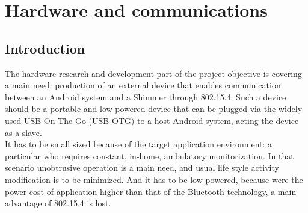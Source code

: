 \chapter{Hardware and communications}
\label{ch:hardware}
	\section{Introduction}	
	\label{sec:hw-intro}




	The hardware research and development part of the project objective is covering a main need: production of an external device that enables communication between an Android system and a Shimmer through 802.15.4. Such a device should be a portable and low-powered device that can be plugged via the widely used USB On-The-Go (USB OTG) to a host Android system, acting the device as a slave.\\

	It has to be small sized because of the target application environment: a particular who requires constant, in-home, ambulatory monitorization. 
	In that scenario unobtrusive operation is a main need, and usual life style activity modification is to be minimized. And it has to be low-powered, because were the power cost of application higher than that of the Bluetooth technology, a main advantage of 802.15.4 is lost.\\ 

